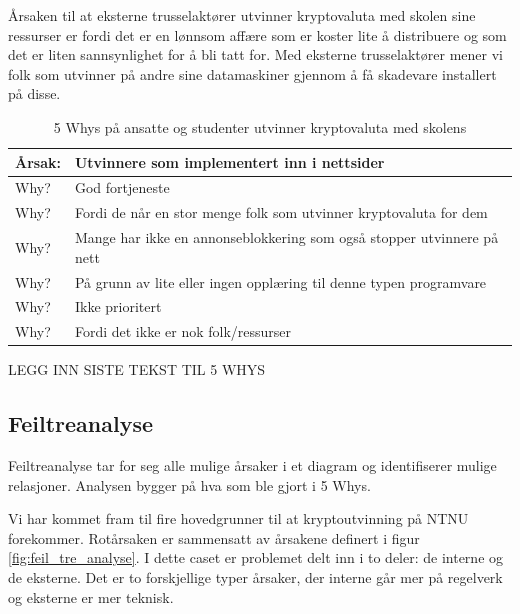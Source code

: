 Årsaken til at eksterne trusselaktører utvinner kryptovaluta med skolen sine ressurser er fordi det er en lønnsom affære som er koster lite å distribuere og som det er liten sannsynlighet for å bli tatt for. Med eksterne trusselaktører mener vi folk som utvinner på andre sine datamaskiner gjennom å få skadevare installert på disse.

\begin{table} [H]
    \centering
    \begin{tabular}{ | m{5em} | m{30em} | }
        \hline
            \cellcolor{yellow} Årsak: & \cellcolor{yellow} Utvinnere som implementert inn i nettsider              \\
        \hline
            Why? & God fortjeneste                                   \\
        \hline
            Why? & Fordi de når en stor menge folk som utvinner kryptovaluta for dem                                           \\
        \hline
            Why? & Mange har ikke en annonseblokkering som også stopper utvinnere på nett               \\
        \hline
            Why? & På grunn av lite eller ingen opplæring til denne typen programvare           \\
        \hline
            Why? & Ikke prioritert    \\
        \hline
            Why? & Fordi det ikke er nok folk/ressurser    \\
        \hline
    \end{tabular}
    \caption[5 Whys: Minere som er implementert inn i nettsider]{5 Whys på ansatte og studenter utvinner kryptovaluta med skolens}
    \label{5Whys-minere}
\end{table}

LEGG INN SISTE TEKST TIL 5 WHYS

\subsection{Feiltreanalyse}
Feiltreanalyse tar for seg alle mulige årsaker i et diagram og identifiserer mulige relasjoner. Analysen bygger på hva som ble gjort i 5 Whys.

Vi har kommet fram til fire hovedgrunner til at kryptoutvinning på NTNU forekommer. Rotårsaken er sammensatt av årsakene definert i figur \ref{fig:feil_tre_analyse}. I dette caset er problemet delt inn i to deler: de interne og de eksterne. Det er to forskjellige typer årsaker, der interne går mer på regelverk og eksterne er mer teknisk. 

